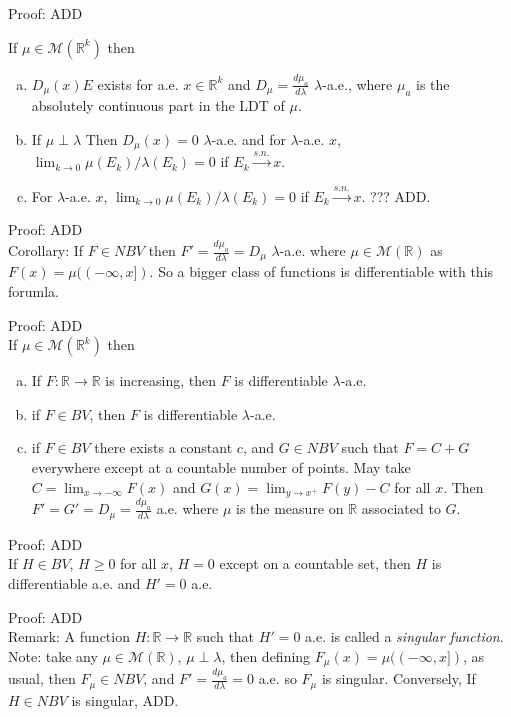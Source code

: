 \documentclass[12pt]{article}
\newcommand{\reals}[0] { \mathbb{R}}
\newcommand{\M}[0] { \mathcal{M} }
\newcommand{\rarw}[0] { \rightarrow }
\begin{document}
\vspace{0.5in}

\noindent
Proof: ADD \\


\break




If $\mu \in \M(\reals^k)$ then
\begin{enumerate}[a)]
\item
$D_\mu(x)E$ exists for a.e. $x \in \reals^k$ and $D_\mu = \frac{d\mu_a}{d\lambda}$ $\lambda$-a.e., where $\mu_a$ is the absolutely continuous part in the LDT of $\mu$.
\item
If $\mu \perp \lambda$ Then $D_\mu(x) = 0$ $\lambda$-a.e. and for $\lambda$-a.e. $x$, $\lim_{k \rarw 0} \mu(E_k) / \lambda(E_k) = 0$ if $E_k \overset{s.n.}{\rarw} x$.
\item
For $\lambda$-a.e. $x$, $\lim_{k \rarw 0} \mu(E_k) / \lambda(E_k) = 0$ if $E_k \overset{s.n.}{\rarw} x$. ??? ADD.
\end{enumerate}



\noindent
Proof: ADD \\

Corollary: If $F \in NBV$ then $F' = \frac{d\mu_a}{d\lambda} = D_\mu$ $\lambda$-a.e. where $\mu \in \M(\reals)$ as $F(x) = \mu((-\infty,x])$. So a bigger class of functions is differentiable with this forumla.

\noindent
Proof: ADD \\



If $\mu \in \M(\reals^k)$ then
\begin{enumerate}[a)]
\item
If $F: \reals \rarw \reals$ is increasing, then $F$ is differentiable $\lambda$-a.e.
\item
if $F \in BV$, then $F$ is differentiable $\lambda$-a.e.
\item
if $F \in BV$  there exists a constant $c$, and $G \in NBV$ such that $F = C + G$ everywhere except at a countable number of points. May take $C = \lim_{x \rarw - \infty}  F(x)$ and $G(x) = \lim_{ y \rarw x^+} F(y) - C$ for all $x$. Then $F' = G' = D_\mu = \frac{d\mu_a}{d\lambda}$ a.e. where $\mu$ is the measure on $\reals$ associated to $G$.
\end{enumerate}


\noindent
Proof: ADD \\


If $H \in BV$, $H \ge 0$ for all $x$, $H = 0$ except on a countable set, then $H$ is differentiable a.e. and $H' = 0$ a.e.


\noindent
Proof: ADD \\

Remark: A function $H: \reals \rarw \reals$ such that $H'=0$ a.e. is called a \emph{singular function}. Note: take any $\mu \in \M(\reals)$, $\mu \perp \lambda$, then defining $F_\mu(x) = \mu((-\infty,x])$, as usual, then $F_\mu \in NBV$, and $F' = \frac{d\mu_a}{d\lambda} = 0$ a.e. so $F_\mu$ is singular. Conversely, If $H \in NBV$ is singular,  ADD.
\end{document}
